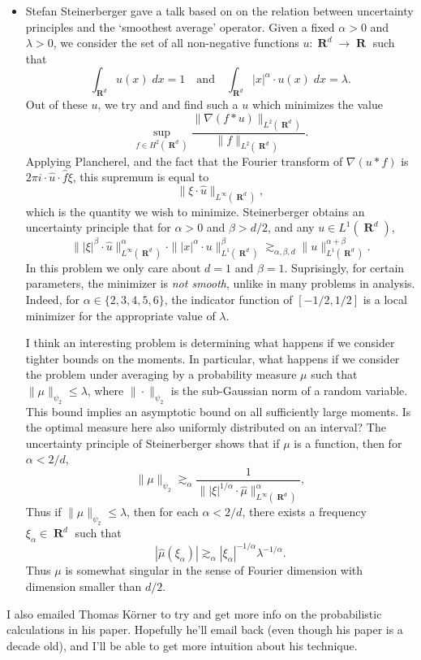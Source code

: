 \documentclass[openany,nobib,nols,a4paper,twoside,symmetric,justified,notoc]{tufte-book}
\theoremstyle{plain}
\theoremstyle{remark}
\theoremstyle{definition}
\DeclareMathOperator{\RR}{\mathbf{R}}
\begin{document}
\begin{itemize}
    \item Stefan Steinerberger gave a talk based on \cite{Steinerberger2020} on the relation between uncertainty principles and the `smoothest average' operator. Given a fixed $\alpha > 0$ and $\lambda > 0$, we consider the set of all non-negative functions $u: \RR^d \to \RR$ such that
    \[ \int_{\RR^d} u(x)\; dx = 1 \quad\text{and}\quad \int_{\RR^d} |x|^\alpha \cdot u(x)\; dx = \lambda. \]
    Out of these $u$, we try and and find such a $u$ which minimizes the value
    \[ \sup_{f \in H^2(\RR^d)} \frac{\| \nabla(f * u) \|_{L^2(\RR^d)}}{\| f \|_{L^2(\RR^d)}}. \]
    Applying Plancherel, and the fact that the Fourier transform of $\nabla (u * f)$ is $2 \pi i \cdot \widehat{u} \cdot \widehat{f} \xi$, this supremum is equal to
    \[ \| \xi \cdot \widehat{u} \|_{L^\infty(\RR^d)}, \]
    which is the quantity we wish to minimize. Steinerberger obtains an uncertainty principle that for $\alpha > 0$ and $\beta > d/2$, and any $u \in L^1(\RR^d)$,
    \[ \| |\xi|^\beta \cdot \widehat{u} \|_{L^\infty(\RR^d)}^\alpha \cdot \| |x|^\alpha \cdot u \|_{L^1(\RR^d)}^\beta \gtrsim_{\alpha,\beta,d} \| u \|_{L^1(\RR^d)}^{\alpha + \beta}. \]
    In this problem we only care about $d = 1$ and $\beta = 1$. Suprisingly, for certain parameters, the minimizer is \emph{not smooth}, unlike in many problems in analysis. Indeed, for $\alpha \in \{ 2,3,4,5,6 \}$, the indicator function of $[-1/2,1/2]$ is a local minimizer for the appropriate value of $\lambda$.

    I think an interesting problem is determining what happens if we consider tighter bounds on the moments. In particular, what happens if we consider the problem under averaging by a probability measure $\mu$ such that $\| \mu \|_{\psi_2} \leq \lambda$, where $\| \cdot \|_{\psi_2}$ is the sub-Gaussian norm of a random variable. This bound implies an asymptotic bound on all sufficiently large moments. Is the optimal measure here also uniformly distributed on an interval? The uncertainty principle of Steinerberger shows that if $\mu$ is a function, then for $\alpha < 2/d$,
    \[ \| \mu \|_{\psi_2} \gtrsim_\alpha \frac{1}{\| |\xi|^{1/\alpha} \cdot \widehat{\mu} \|_{L^\infty(\RR^d)}^\alpha}, \]
    Thus if $\| \mu \|_{\psi_2} \leq \lambda$, then for each $\alpha < 2/d$, there exists a frequency $\xi_\alpha \in \RR^d$ such that
    \[ |\widehat{\mu}(\xi_\alpha)| \gtrsim_\alpha |\xi_\alpha|^{-1/\alpha} \lambda^{-1/\alpha}. \]
    Thus $\mu$ is somewhat singular in the sense of Fourier dimension with dimension smaller than $d/2$.
\end{itemize}
%
I also emailed Thomas K\"{o}rner to try and get more info on the probabilistic calculations in his paper. Hopefully he'll email back (even though his paper is a decade old), and I'll be able to get more intuition about his technique.
\end{document}
